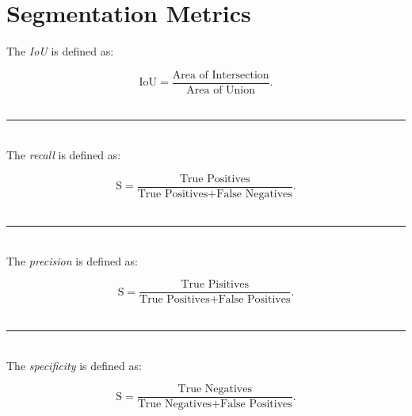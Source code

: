
\chapter{Segmentation Metrics} %

\label{AppendixB} %


The \textit{IoU} is defined as:

\begin{equation}
\textrm{IoU} = \frac{\textrm{Area of Intersection}}{\textrm{Area of Union}}.
\end{equation}\\

\rule{\linewidth}{1pt}\\

The \textit{recall} is defined as: 

\begin{equation}
\textrm{S} = \frac{\textrm{True Positives}}{\textrm{True Positives} + \textrm{False Negatives}}.
\end{equation}\\

\rule{\linewidth}{1pt}\\

The \textit{precision} is defined as: 

\begin{equation}
\textrm{S} = \frac{\textrm{True Pisitives}}{\textrm{True Positives} + \textrm{False Positives}}.
\end{equation}\\

\rule{\linewidth}{1pt}\\

The \textit{specificity} is defined as: 

\begin{equation}
\textrm{S} = \frac{\textrm{True Negatives}}{\textrm{True Negatives} + \textrm{False Positives}}.
\end{equation}